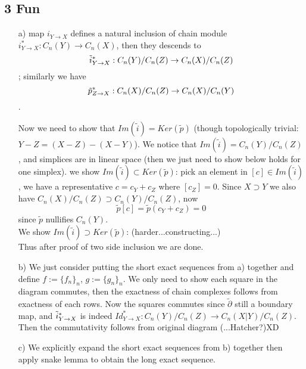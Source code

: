 \documentclass[11pt]{article}
\def\p{\partial}
\theoremstyle{remark}
\begin{document}
\subsection*{3 Fun}
\begin{itemize}
    \item [a)] map $i_{Y\rightarrow X}$ defines a natural inclusion of chain module $i_{Y\rightarrow X}^*: C_n(Y)\rightarrow C_n(X)$, then they descends to $$\Tilde{i}_{Y\rightarrow X}^*: C_n(Y)/C_n(Z)\rightarrow C_n(X)/C_n(Z)$$; similarly we have $$\Tilde{p}_{Z\rightarrow X}^*: C_n(X)/C_n(Z)\rightarrow C_n(X)/C_n(Y)$$. 
    
    Now we need to show that $Im(\tilde{i})=Ker(\tilde{p})$ (though topologically trivial: $Y-Z=(X-Z)-(X-Y)$). We notice that $Im(\tilde{i})=C_n(Y)/C_n(Z)$, and simplices are in linear space (then we just need to show below holds for one simplex).
    we show $Im(\tilde{i})\subset Ker(\tilde{p})$: pick an element in $[c] \in Im(\tilde{i})$, we have a representative $c=c_Y+c_Z$ where $[c_Z]=0$. Since $X\supset Y$ we also have $C_n(X)/C_n(Z)\supset C_n(Y)/C_n(Z)$, now $$\tilde{p}[c]=\tilde{p}(c_Y+c_Z)=0$$ since $\tilde{p}$ nullifies $C_n(Y)$. \\
    
    We show $Im(\tilde{i})\supset Ker(\tilde{p})$: (harder...constructing...)  \\
    Thus after proof of two side inclusion we are done. 
    
    \item[b)] We just consider putting the short exact sequences from a) together and define $f:=\{f_n\}_n$, $g:=\{g_n\}_n$. We only need to show each square in the diagram commutes, then the exactness of chain complexes follows from exactness of each rows. Now the squares commutes since $\tilde{\p}$ still a boundary map, and $\Tilde{i}_{Y\rightarrow X}^*$ is indeed $Id_{Y\rightarrow X}^*:C_n(Y)/C_n(Z)\rightarrow C_n(X|Y)/C_n(Z)$. Then the commutativity follows from original diagram (...Hatcher?)XD
    
    \item[c)] We explicitly expand the short exact sequences from b) together then apply snake lemma to obtain the long exact sequence.
\end{itemize}
\end{document}
